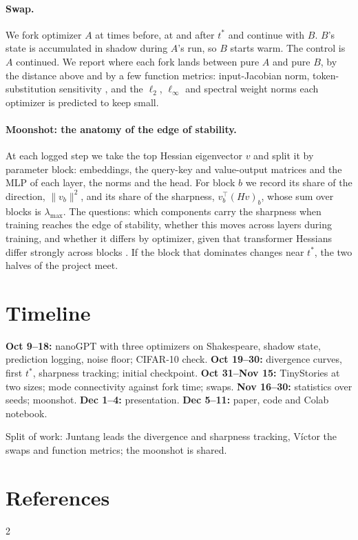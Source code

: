 \documentclass[10pt]{article}
\begin{document}
\paragraph{Swap.} We fork optimizer $A$ at times before, at and after $t^\ast$ and continue with $B$.
$B$'s state is accumulated in shadow during $A$'s run, so $B$ starts warm. The control is $A$
continued. We report where each fork lands between pure $A$ and pure $B$, by the distance above and by a few
function metrics: input-Jacobian norm, token-substitution sensitivity \citep{hahn2021sensitivity},
and the $\ell_2$, $\ell_\infty$ and spectral weight norms each optimizer is predicted to keep small.

\paragraph{Moonshot: the anatomy of the edge of stability.}
At each logged step we take the top Hessian eigenvector $v$ and split it by parameter block:
embeddings, the query-key and value-output matrices and the MLP of each layer, the norms and the head.
For block $b$ we record its share of the direction, $\|v_b\|^2$, and its share of the sharpness,
$v_b^\top (Hv)_b$, whose sum over blocks is $\lambda_{\max}$. The questions: which components carry
the sharpness when training reaches the edge of stability, whether this moves across layers during
training, and whether it differs by optimizer, given that transformer Hessians differ strongly across
blocks \citep{zhang2024hessian}. If the block that dominates changes near $t^\ast$, the two halves of
the project meet.

\section{Timeline}

\textbf{Oct 9--18:} nanoGPT with three optimizers on Shakespeare, shadow state, prediction logging,
noise floor; CIFAR-10 check. \textbf{Oct 19--30:} divergence curves, first $t^\ast$, sharpness
tracking; initial checkpoint. \textbf{Oct 31--Nov 15:} TinyStories at two sizes; mode connectivity
against fork time; swaps. \textbf{Nov 16--30:} statistics over seeds; moonshot. \textbf{Dec 1--4:}
presentation. \textbf{Dec 5--11:} paper, code and Colab notebook.

Split of work: Juntang leads the divergence and sharpness tracking, V\'ictor the swaps and function
metrics; the moonshot is shared.

\section*{References}
{\scriptsize\setlength{\bibitemsep}{0pt}\begin{multicols}{2}\printbibliography[heading=none]\end{multicols}}
\end{document}
